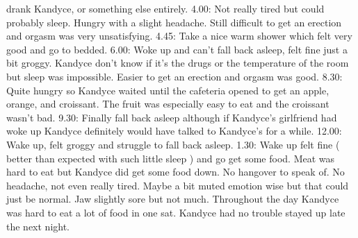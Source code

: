 \documentclass[12pt]{book}
\begin{document}
drank Kandyce, or something else entirely. 4.00: Not really tired but could probably sleep. Hungry with a slight headache. Still difficult to get an erection and orgasm was very unsatisfying. 4.45: Take a nice warm shower which felt very good and go to bedded. 6.00: Woke up and can't fall back asleep, felt fine just a bit groggy. Kandyce don't know if it's the drugs or the temperature of the room but sleep was impossible. Easier to get an erection and orgasm was good. 8.30: Quite hungry so Kandyce waited until the cafeteria opened to get an apple, orange, and croissant. The fruit was especially easy to eat and the croissant wasn't bad. 9.30: Finally fall back asleep although if Kandyce's girlfriend had woke up Kandyce definitely would have talked to Kandyce's for a while. 12.00: Wake up, felt groggy and struggle to fall back asleep. 1.30: Wake up felt fine ( better than expected with such little sleep ) and go get some food. Meat was hard to eat but Kandyce did get some food down. No hangover to speak of. No headache, not even really tired. Maybe a bit muted emotion wise but that could just be normal. Jaw slightly sore but not much. Throughout the day Kandyce was hard to eat a lot of food in one sat. Kandyce had no trouble stayed up late the next night.
\end{document}
